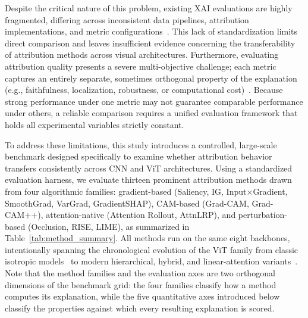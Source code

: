 \documentclass[final,5p,times,twocolumn]{elsarticle}
\begin{document}
Despite the critical nature of this problem, existing XAI evaluations are highly fragmented, differing across inconsistent data pipelines, attribution implementations, and metric configurations~\cite{bodria2023benchmarking,brandt2023precise}. This lack of standardization limits direct comparison and leaves insufficient evidence concerning the transferability of attribution methods across visual architectures. Furthermore, evaluating attribution quality presents a severe multi-objective challenge; each metric captures an entirely separate, sometimes orthogonal property of the explanation (e.g., faithfulness, localization, robustness, or computational cost)~\cite{nauta2023anecdotal,hedstrom2023quantus}. Because strong performance under one metric may not guarantee comparable performance under others, a reliable comparison requires a unified evaluation framework that holds all experimental variables strictly constant.

To address these limitations, this study introduces a controlled, large-scale benchmark designed specifically to examine whether attribution behavior transfers consistently across CNN and ViT architectures. Using a standardized evaluation harness, we evaluate thirteen prominent attribution methods drawn from four algorithmic families: gradient-based (Saliency, IG, Input$\times$Gradient, SmoothGrad, VarGrad, GradientSHAP), CAM-based (Grad-CAM, Grad-CAM++), attention-native (Attention Rollout, AttnLRP), and perturbation-based (Occlusion, RISE, LIME), as summarized in Table~\ref{tab:method_summary}. All methods run on the same eight backbones, intentionally spanning the chronological evolution of the ViT family from classic isotropic models~\cite{dosovitskiy2021vit,touvron2021deit} to modern hierarchical, hybrid, and linear-attention variants~\cite{liu2021swin,mehta2022mobilevit,cai2023efficientvit}. Note that the method families and the evaluation axes are two orthogonal dimensions of the benchmark grid: the four families classify how a method computes its explanation, while the five quantitative axes introduced below classify the properties against which every resulting explanation is scored.
\end{document}
